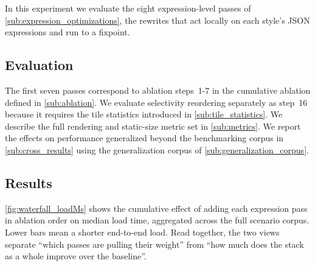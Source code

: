 \noindent In this experiment we evaluate the eight expression-level passes of \cref{sub:expression_optimizations}, the rewrites that act locally on each style's \ac{JSON} expressions and run to a fixpoint.

\subsection{Evaluation}\label{sub:expr_evaluation}

The first seven passes correspond to ablation steps~1-7 in the cumulative ablation defined in \cref{sub:ablation}.
We evaluate selectivity reordering separately as step~16 because it requires the tile statistics introduced in \cref{sub:tile_statistics}.
We describe the full rendering and static-size metric set in \cref{sub:metrics}.
We report the effects on performance generalized beyond the benchmarking corpus in \cref{sub:cross_results} using the generalization corpus of \cref{sub:generalization_corpus}.

\subsection{Results}\label{sub:expr_results}

\cref{fig:waterfall_loadMs} shows the cumulative effect of adding each expression pass in ablation order on median load time, aggregated across the full scenario corpus.
Lower bars mean a shorter end-to-end load.
Read together, the two views separate \enquote{which passes are pulling their weight} from \enquote{how much does the stack as a whole improve over the baseline}.

